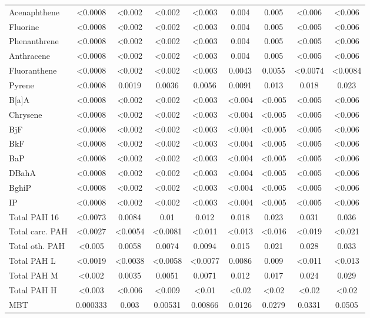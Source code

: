 \documentclass[algorithms,article,submit,pdftex,moreauthors]{Definitions/mdpi}
\begin{document}
\begin{scriptsize}
\begin{center}
\begin{longtable}{@{\extracolsep{\fill}}|p{1.8cm}|cccccccc|@{}}
Acenaphthene & <0.0008 & <0.002 & <0.002 & <0.003 & 0.004 & 0.005 & <0.006 & <0.006 \\
Fluorine & <0.0008 & <0.002 & <0.002 & <0.003 & 0.004 & 0.005 & <0.005 & <0.006 \\
Phenanthrene & <0.0008 & <0.002 & <0.002 & <0.003 & 0.004 & 0.005 & <0.005 & <0.006 \\
Anthracene & <0.0008 & <0.002 & <0.002 & <0.003 & 0.004 & 0.005 & <0.005 & <0.006 \\
Fluoranthene & <0.0008 & <0.002 & <0.002 & <0.003 & 0.0043 & 0.0055 & <0.0074 & <0.0084 \\
Pyrene & <0.0008 & 0.0019 & 0.0036 & 0.0056 & 0.0091 & 0.013 & 0.018 & 0.023 \\
B[a]A & <0.0008 & <0.002 & <0.002 & <0.003 & <0.004 & <0.005 & <0.005 & <0.006 \\
Chrysene & <0.0008 & <0.002 & <0.002 & <0.003 & <0.004 & <0.005 & <0.005 & <0.006 \\
BjF & <0.0008 & <0.002 & <0.002 & <0.003 & <0.004 & <0.005 & <0.005 & <0.006 \\
BkF & <0.0008 & <0.002 & <0.002 & <0.003 & <0.004 & <0.005 & <0.005 & <0.006 \\
BaP & <0.0008 & <0.002 & <0.002 & <0.003 & <0.004 & <0.005 & <0.005 & <0.006 \\
DBahA & <0.0008 & <0.002 & <0.002 & <0.003 & <0.004 & <0.005 & <0.005 & <0.006 \\
BghiP & <0.0008 & <0.002 & <0.002 & <0.003 & <0.004 & <0.005 & <0.005 & <0.006 \\
IP & <0.0008 & <0.002 & <0.002 & <0.003 & <0.004 & <0.005 & <0.005 & <0.006 \\
Total PAH 16 & <0.0073 & 0.0084 & 0.01 & 0.012 & 0.018 & 0.023 & 0.031 & 0.036 \\
Total carc. PAH & <0.0027 & <0.0054 & <0.0081 & <0.011 & <0.013 & <0.016 & <0.019 & <0.021 \\
Total oth. PAH & <0.005 & 0.0058 & 0.0074 & 0.0094 & 0.015 & 0.021 & 0.028 & 0.033 \\
Total PAH L & <0.0019 & <0.0038 & <0.0058 & <0.0077 & 0.0086 & 0.009 & <0.011 & <0.013 \\
Total PAH M & <0.002 & 0.0035 & 0.0051 & 0.0071 & 0.012 & 0.017 & 0.024 & 0.029 \\
Total PAH H & <0.003 & <0.006 & <0.009 & <0.01 & <0.02 & <0.02 & <0.02 & <0.02 \\
MBT & 0.000333 & 0.003 & 0.00531 & 0.00866 & 0.0126 & 0.0279 & 0.0331 & 0.0505 \\

\end{longtable}
\end{center}
\end{scriptsize}
\end{document}
